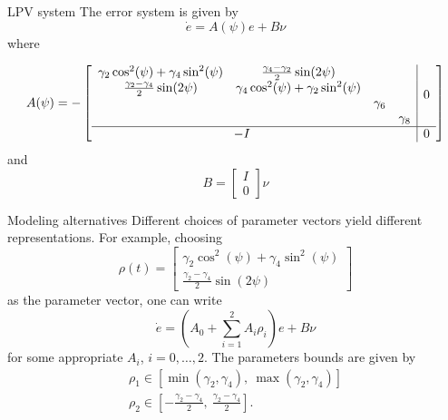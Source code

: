 \begin{frame}{LPV system}
	The error system is given by
	\begin{equation*} \label{eq:err_simple}
	\dot{e} =  A(\psi)e + B\nu
	\end{equation*} where
	
	\begin{equation*}
			A(\psi)=-\begin{bmatrix} \begin{array}{cccc|c}
				\gamma_{2}\cos^{2}(\psi) + \gamma_{4}\sin^{2}(\psi) &  \frac{\gamma_{4}-\gamma_{2}}{2}\sin(2\psi)&  &  & \multirow{4}{*}{0}\\
				\frac{\gamma_{2}-\gamma_{4}}{2}\sin(2\psi) & \gamma_{4}\cos^{2}(\psi) + \gamma_{2}\sin^{2}(\psi) &  &  &\\
				&  & \gamma_6 & &\\
				&  &  & \gamma_8& \\ \hline
				\multicolumn{3}{c}{-I} & & 0
				\end{array}
				\end{bmatrix}
	\end{equation*} and \begin{equation*}
		B = \begin{bmatrix}
				I\\
				0
			\end{bmatrix}\nu
			\end{equation*}
\end{frame}
\begin{frame}{Modeling alternatives}
	Different choices of parameter vectors yield different representations. For example, choosing  
	\begin{equation} \label{eq:param_init}
	\rho(t) = \begin{bmatrix}
	\gamma_{2}\cos^{2}(\psi) + \gamma_{4}\sin^{2}(\psi) \\
	\frac{\gamma_{2}-\gamma_{4}}{2}\sin(2\psi)
	\end{bmatrix}
	\end{equation} 
	as the parameter vector, one can write 
	\begin{equation} \label{eq:err_LPV}
	\dot{e} =  (A_{0} + \sum_{i=1}^{2}A_{i}\rho_{i})e + B\nu
	\end{equation} 
	for some appropriate $A_i$, $i=0,\dots, 2$. The parameters bounds are given by 
	\begin{equation} \label{eq:param_init_bounds}
	\begin{aligned}
	\rho_{1} \in [\min(\gamma_{2},\gamma_{4}), ~\max(\gamma_{2},\gamma_{4})]\\
	\rho_{2} \in [-\frac{\gamma_{2}-\gamma_{4}}{2},~\frac{\gamma_{2}-\gamma_{4}}{2}].
	\end{aligned}
	\end{equation} 
\end{frame}
